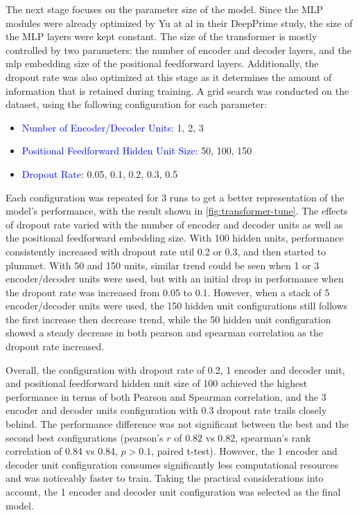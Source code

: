 The next stage focuses on the parameter size of the model. Since the MLP modules were already optimized by Yu at al in their DeepPrime study, the size of the MLP layers were kept constant. The size of the transformer is mostly controlled by two parameters: the number of encoder and decoder layers, and the mlp embedding size of the positional feedforward layers. Additionally, the dropout rate was also optimized at this stage as it determines the amount of information that is retained during training. A grid search was conducted on the dataset, using the following configuration for each parameter:

\begin{itemize}[itemsep=-0mm]
    \item \textcolor{blue}{Number of Encoder/Decoder Units}: 1, 2, 3
    \item \textcolor{blue}{Positional Feedforward Hidden Unit Size}: 50, 100, 150
    \item \textcolor{blue}{Dropout Rate}: 0.05, 0.1, 0.2, 0.3, 0.5
\end{itemize}

Each configuration was repeated for 3 runs to get a better representation of the model's performance, with the result shown in \autoref{fig:transformer-tune}. 
The effects of dropout rate varied with the number of encoder and decoder units as well as the positional feedforward embedding size. With 100 hidden units, performance consistently increased with dropout rate util 0.2 or 0.3, and then started to plummet. With 50 and 150 units, similar trend could be seen when 1 or 3 encoder/decoder units were used, but with an initial drop in performance when the dropout rate was increased from 0.05 to 0.1. However, when a stack of 5 encoder/decoder units were used, the 150 hidden unit configurations still follows the first increase then decrease trend, while the 50 hidden unit configuration showed a steady decrease in both pearson and spearman correlation as the dropout rate increased.

Overall, the configuration with dropout rate of 0.2, 1 encoder and decoder unit, and positional feedforward hidden unit size of 100 achieved the highest performance in terms of both Pearson and Spearman correlation, and the 3 encoder and decoder units configuration with 0.3 dropout rate trails closely behind. The performance difference was not significant between the best and the second best configurations (pearson's $r$ of 0.82 vs 0.82, spearman's rank correlation of 0.84 vs 0.84, $p>0.1$, paired t-test). However, the 1 encoder and decoder unit configuration consumes significantly less computational resources and was noticeably faster to train. Taking the practical considerations into account, the 1 encoder and decoder unit configuration was selected as the final model.

